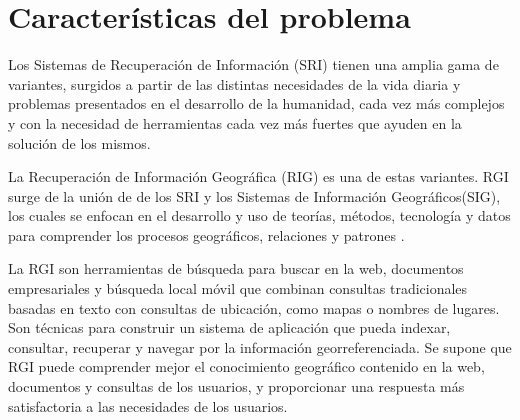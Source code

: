 \section{Características del problema}\label{sec:prob-charact}

Los Sistemas de Recuperación de Información (SRI) tienen una amplia gama de
variantes, surgidos a partir de las distintas necesidades de la vida diaria y
problemas presentados en el desarrollo de la humanidad, cada vez más complejos
y con la necesidad de herramientas cada vez más fuertes que ayuden en la
solución de los mismos. 

La Recuperación de Información Geográfica (RIG) es una de estas variantes. RGI
surge de la unión de de los SRI y los Sistemas de Información Geográficos(SIG),
los cuales se enfocan en el desarrollo y uso de teorías, métodos, tecnología y
datos para comprender los procesos geográficos, relaciones y patrones
\cite{chang2016}.


La RGI son herramientas de búsqueda para buscar en la web, documentos
empresariales y búsqueda local móvil que combinan consultas tradicionales
basadas en texto con consultas de ubicación, como mapas o nombres de lugares.
Son técnicas para construir un sistema de aplicación que pueda indexar,
consultar, recuperar y navegar por la información georreferenciada. Se supone
que RGI puede comprender mejor el conocimiento geográfico contenido en la web,
documentos y consultas de los usuarios, y proporcionar una respuesta más
satisfactoria a las necesidades de los usuarios.

\newpage
